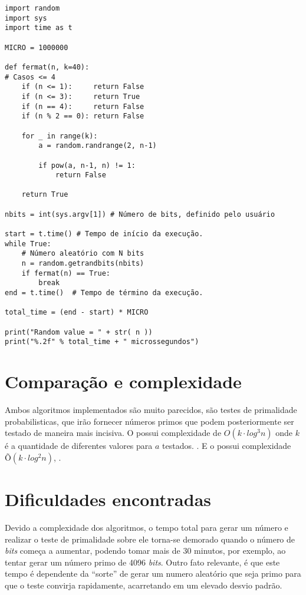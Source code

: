 \documentclass[
    article,            %
    11pt,               %
    oneside,            %
    a4paper,            %
    english,            %
    brazil,             %
    sumario=tradicional,
    ]{abntex2}
\begin{document}
\begin{lstlisting}[frame=single, title={fermat.py}]
import random 
import sys
import time as t

MICRO = 1000000

def fermat(n, k=40):
# Casos <= 4
    if (n <= 1):     return False
    if (n <= 3):     return True
    if (n == 4):     return False
    if (n % 2 == 0): return False

    for _ in range(k):
        a = random.randrange(2, n-1)

        if pow(a, n-1, n) != 1:
            return False

    return True

nbits = int(sys.argv[1]) # Número de bits, definido pelo usuário

start = t.time() # Tempo de início da execução.
while True:
    # Número aleatório com N bits
    n = random.getrandbits(nbits) 
    if fermat(n) == True:
        break
end = t.time()  # Tempo de término da execução.

total_time = (end - start) * MICRO

print("Random value = " + str( n ))
print("%.2f" % total_time + " microssegundos")
\end{lstlisting}




\section{\textbf{Comparação e complexidade}}

Ambos algoritmos implementados são muito parecidos, são testes de primalidade probabilisticas, que irão fornecer números primos que podem posteriormente ser testado de maneira mais incisiva. O   possui complexidade de $O(k \cdot log^3n)$ onde $k$ é a quantidade de diferentes valores para $a$ testados. \cite{miller_rabin_wiki}. E o  possui complexidade $Õ(k \cdot log^2n)$, \cite{fermat_wiki}.

\section{\textbf{Dificuldades encontradas}}

Devido a complexidade dos algoritmos, o tempo total para gerar um número e realizar o teste de primalidade sobre ele torna-se demorado quando o número de \textit{bits} começa a aumentar, podendo tomar mais de 30 minutos, por exemplo, ao tentar gerar um número primo de 4096 \textit{bits}. Outro fato relevante, é que este tempo é dependente da ``sorte'' de gerar um numero aleatório que seja primo para que o teste convirja rapidamente, acarretando em um elevado desvio padrão.
\end{document}
